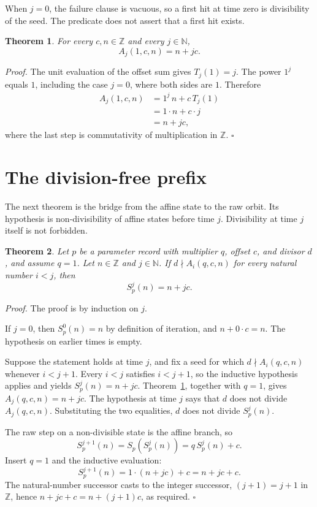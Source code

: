 \documentclass[11pt,letterpaper]{article}
\newcommand{\N}{\mathbb{N}}
\newcommand{\Z}{\mathbb{Z}}
\newtheorem{theorem}{Theorem}
\newenvironment{proof}{\noindent\textit{Proof.}}{\hfill\(\square\)}
\begin{document}
When \(j=0\), the failure clause is vacuous, so a first hit at time zero is
divisibility of the seed. The predicate does not assert that a first hit
exists.

\begin{theorem}
\label{thm:unit-affine}
For every \(c,n\in\Z\) and every \(j\in\N\),
\[
A_j(1,c,n)=n+jc.
\]
\end{theorem}

\begin{proof}
The unit evaluation of the offset sum gives \(T_j(1)=j\). The power \(1^j\)
equals \(1\), including the case \(j=0\), where both sides are \(1\). Therefore
\begin{align*}
A_j(1,c,n)
&=1^j\,n+c\,T_j(1)\\
&=1\cdot n+c\cdot j\\
&=n+jc,
\end{align*}
where the last step is commutativity of multiplication in \(\Z\).
\end{proof}

\section{The division-free prefix}

The next theorem is the bridge from the affine state to the raw orbit. Its
hypothesis is non-divisibility of affine states before time \(j\).
Divisibility at time \(j\) itself is not forbidden.

\begin{theorem}
\label{thm:unit-prefix}
Let \(p\) be a parameter record with multiplier \(q\), offset \(c\), and
divisor \(d\), and assume \(q=1\). Let \(n\in\Z\) and \(j\in\N\). If
\(d\nmid A_i(q,c,n)\) for every natural number \(i<j\), then
\[
S_p^{j}(n)=n+jc.
\]
\end{theorem}

\begin{proof}
The proof is by induction on \(j\).

If \(j=0\), then \(S_p^{0}(n)=n\) by definition of iteration, and
\(n+0\cdot c=n\). The hypothesis on earlier times is empty.

Suppose the statement holds at time \(j\), and fix a seed for which
\(d\nmid A_i(q,c,n)\) whenever \(i<j+1\). Every \(i<j\) satisfies \(i<j+1\),
so the inductive hypothesis applies and yields \(S_p^{j}(n)=n+jc\).
Theorem~\ref{thm:unit-affine}, together with \(q=1\), gives
\(A_j(q,c,n)=n+jc\). The hypothesis at time \(j\) says that \(d\) does not
divide \(A_j(q,c,n)\). Substituting the two equalities, \(d\) does not divide
\(S_p^{j}(n)\).

The raw step on a non-divisible state is the affine branch, so
\[
S_p^{j+1}(n)=S_p(S_p^{j}(n))=q\,S_p^{j}(n)+c.
\]
Insert \(q=1\) and the inductive evaluation:
\[
S_p^{j+1}(n)=1\cdot(n+jc)+c=n+jc+c.
\]
The natural-number successor casts to the integer successor,
\((j+1)=j+1\) in \(\Z\), hence \(n+jc+c=n+(j+1)c\), as required.
\end{proof}
\end{document}
